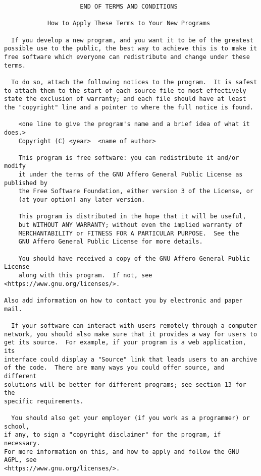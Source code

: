 \documentclass[11pt]{article}
\begin{document}
\begin{verbatim}
                     END OF TERMS AND CONDITIONS

            How to Apply These Terms to Your New Programs

  If you develop a new program, and you want it to be of the greatest
possible use to the public, the best way to achieve this is to make it
free software which everyone can redistribute and change under these terms.

  To do so, attach the following notices to the program.  It is safest
to attach them to the start of each source file to most effectively
state the exclusion of warranty; and each file should have at least
the "copyright" line and a pointer to where the full notice is found.

    <one line to give the program's name and a brief idea of what it does.>
    Copyright (C) <year>  <name of author>

    This program is free software: you can redistribute it and/or modify
    it under the terms of the GNU Affero General Public License as published by
    the Free Software Foundation, either version 3 of the License, or
    (at your option) any later version.

    This program is distributed in the hope that it will be useful,
    but WITHOUT ANY WARRANTY; without even the implied warranty of
    MERCHANTABILITY or FITNESS FOR A PARTICULAR PURPOSE.  See the
    GNU Affero General Public License for more details.

    You should have received a copy of the GNU Affero General Public License
    along with this program.  If not, see <https://www.gnu.org/licenses/>.

Also add information on how to contact you by electronic and paper mail.

  If your software can interact with users remotely through a computer
network, you should also make sure that it provides a way for users to
get its source.  For example, if your program is a web application, its
interface could display a "Source" link that leads users to an archive
of the code.  There are many ways you could offer source, and different
solutions will be better for different programs; see section 13 for the
specific requirements.

  You should also get your employer (if you work as a programmer) or school,
if any, to sign a "copyright disclaimer" for the program, if necessary.
For more information on this, and how to apply and follow the GNU AGPL, see
<https://www.gnu.org/licenses/>.

\end{verbatim}
\end{document}
